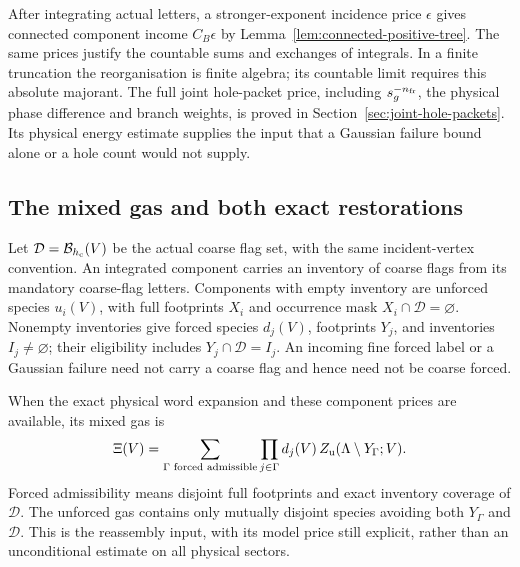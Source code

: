 \documentclass[11pt,reqno]{amsart}
\numberwithin{equation}{section}
\theoremstyle{definition}
\theoremstyle{remark}
\begin{document}
After integrating actual letters, a stronger-exponent incidence
price \(\epsilon\) gives connected component income
\(C_B\epsilon\) by Lemma~\ref{lem:connected-positive-tree}.
The same prices justify the countable sums and exchanges of
integrals. In a finite truncation the reorganisation is finite
algebra; its countable limit requires this absolute majorant.
The full joint hole-packet price, including
\(s_g^{-n_{\rm fr}}\), the physical phase difference and branch
weights, is proved in Section~\ref{sec:joint-hole-packets}.
Its physical energy estimate supplies the input that a Gaussian
failure bound alone or a hole count would not supply.

\subsection{The mixed gas and both exact restorations}

Let \(\mathcal D=\mathcal B_{h_{\rm c}}(V)\) be the actual
coarse flag set, with the same incident-vertex convention.
An integrated component carries an inventory of coarse flags
from its mandatory coarse-flag letters. Components with empty
inventory are unforced species \(u_i(V)\), with full footprints
\(X_i\) and occurrence mask \(X_i\cap\mathcal D=\varnothing\).
Nonempty inventories give forced species \(d_j(V)\), footprints
\(Y_j\), and inventories \(I_j\ne\varnothing\); their eligibility
includes \(Y_j\cap\mathcal D=I_j\).
An incoming fine forced label or a Gaussian failure need not
carry a coarse flag and hence need not be coarse forced.

When the exact physical word expansion and these component prices
are available, its mixed gas is
\begin{equation}
 \Xi(V)=\sum_{\Gamma\text{ forced admissible}}
       \prod_{j\in\Gamma}d_j(V)\,
                 Z_{\rm u}(\Lambda\setminus Y_\Gamma;V).
 \label{eq:reassembly-mixed-gas}
\end{equation}
Forced admissibility means disjoint full footprints and exact
inventory coverage of \(\mathcal D\). The unforced gas contains
only mutually disjoint species avoiding both \(Y_\Gamma\) and
\(\mathcal D\). This is the reassembly input, with its model
price still explicit, rather than an unconditional estimate on
all physical sectors.
\end{document}
